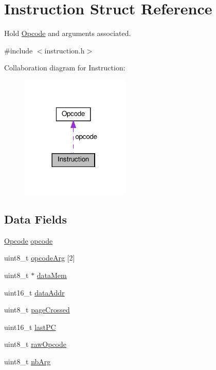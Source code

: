 \hypertarget{struct_instruction}{}\section{Instruction Struct Reference}
\label{struct_instruction}


Hold \hyperlink{struct_opcode}{Opcode} and arguments associated.  




{\ttfamily \#include $<$instruction.\+h$>$}



Collaboration diagram for Instruction\+:\nopagebreak
\begin{figure}[H]
\begin{center}
\leavevmode
\includegraphics[width=146pt]{struct_instruction__coll__graph}
\end{center}
\end{figure}
\subsection*{Data Fields}
\begin{DoxyCompactItemize}
\item 
\hyperlink{struct_opcode}{Opcode} \hyperlink{struct_instruction_a4ee0311d643454fcf8d4f707fba72a6d}{opcode}
\item 
uint8\+\_\+t \hyperlink{struct_instruction_a59180d12e1d75e81d606a437f3abb293}{opcode\+Arg} \mbox{[}2\mbox{]}
\item 
uint8\+\_\+t $\ast$ \hyperlink{struct_instruction_a42066ad070971025cb7f59390afe49a5}{data\+Mem}
\item 
uint16\+\_\+t \hyperlink{struct_instruction_a88c67627f4474a4fbe6ccabcd34521ae}{data\+Addr}
\item 
uint8\+\_\+t \hyperlink{struct_instruction_a6d48ff193a5218fe9f4089254160f19c}{page\+Crossed}
\item 
uint16\+\_\+t \hyperlink{struct_instruction_a6e22f1a0885905391e81ecf7d78ecf35}{last\+PC}
\item 
uint8\+\_\+t \hyperlink{struct_instruction_a62e2f27f9942405e7def81df4c2b664f}{raw\+Opcode}
\item 
uint8\+\_\+t \hyperlink{struct_instruction_a61f9076307ef1f322f6af2e1b1adea55}{nb\+Arg}
\end{DoxyCompactItemize}


